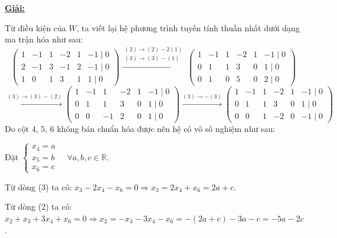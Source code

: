 \documentclass[12pt,a4paper]{article}
\newcommand{\R}{\mathbb{R}}
\begin{document}
\underline{\textbf{Giải:}}

Từ điều kiện của $W$, ta viết lại hệ phương trình tuyến tính thuần nhất dưới dạng ma trận hóa như sau:
\[
\begin{pmatrix} 
1 & -1 & 1 & -2 & 1 & -1 \mid 0 \\ 
2 & -1 & 3 & -1 & 2 & -1 \mid 0 \\ 
1 & 0 & 1 & 3 & 1 & 1 \mid 0 
\end{pmatrix}
\xrightarrow{\substack{(2) \to (2) - 2(1) \\ (3) \to (3) - (1)}}
\begin{pmatrix} 
1 & -1 & 1 & -2 & 1 & -1 \mid 0 \\ 
0 & 1 & 1 & 3 & 0 & 1 \mid 0 \\ 
0 & 1 & 0 & 5 & 0 & 2 \mid 0 
\end{pmatrix}
\]
\[
\xrightarrow{(3) \to (3) - (2)}
\begin{pmatrix} 
1 & -1 & 1 & -2 & 1 & -1 \mid 0 \\ 
0 & 1 & 1 & 3 & 0 & 1 \mid 0 \\ 
0 & 0 & -1 & 2 & 0 & 1 \mid 0 
\end{pmatrix}
\xrightarrow{(3) \to -(3)}
\begin{pmatrix} 
1 & -1 & 1 & -2 & 1 & -1 \mid 0 \\ 
0 & 1 & 1 & 3 & 0 & 1 \mid 0 \\ 
0 & 0 & 1 & -2 & 0 & -1 \mid 0 
\end{pmatrix}
\]
Do cột 4, 5, 6 không bán chuẩn hóa được nên hệ có vô số nghiệm như sau:

Đặt $\begin{cases} x_4 = a \\ x_5 = b \\ x_6 = c \end{cases} \quad \forall a, b, c \in \R$.

Từ dòng (3) ta có: $x_3 - 2x_4 - x_6 = 0 \Rightarrow x_3 = 2x_4 + x_6 = 2a + c$.

Từ dòng (2) ta có: $x_2 + x_3 + 3x_4 + x_6 = 0 \Rightarrow x_2 = -x_3 - 3x_4 - x_6 = -(2a + c) - 3a - c = -5a - 2c$.
\end{document}
